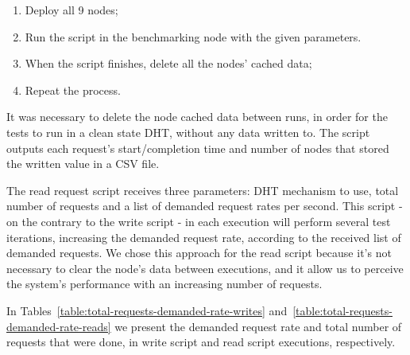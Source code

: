 \begin{enumerate}
  \item Deploy all 9 nodes;
  \item Run the script in the benchmarking node with the given parameters.
  \item When the script finishes, delete all the nodes' cached data;
  \item Repeat the process.
\end{enumerate}

It was necessary to delete the node cached data between runs, in order for the tests to run in a clean state DHT, without any data written to.
The script outputs each request's start/completion time and number of nodes that stored the written value in a CSV file.

The read request script receives three parameters: DHT mechanism to use, total number of requests and a list of demanded request rates per second.
This script - on the contrary to the write script - in each execution will perform several test iterations, increasing the demanded request rate, according to the received list of demanded requests.
We chose this approach for the read script because it's not necessary to clear the node's data between executions, and it allow us to perceive the system's performance with an increasing number of requests.

In Tables~\ref{table:total-requests-demanded-rate-writes} and~\ref{table:total-requests-demanded-rate-reads} we present the demanded request rate and total number of requests that were done, in write script and read script executions, respectively.

\begin{table}[htb]
\centering
{}
\caption{Number of write requests performed according to demanded request rate}
\label{table:total-requests-demanded-rate-writes}
\end{table}

